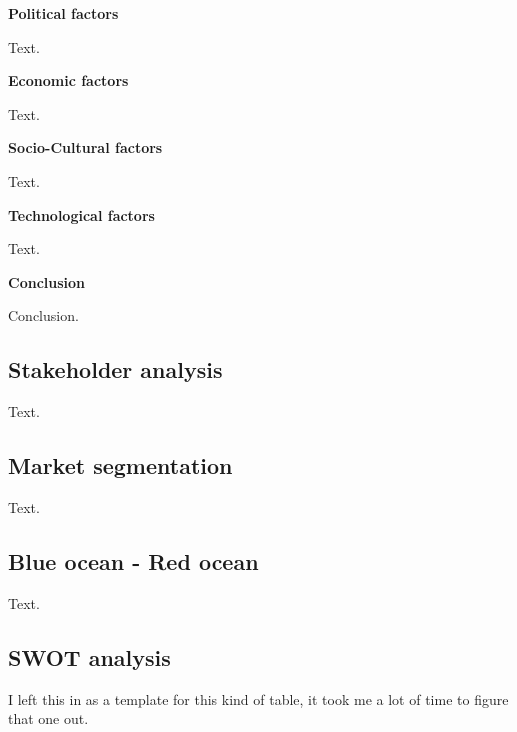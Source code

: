 \documentclass[12p]{article}
\begin{document}
\textbf{Political factors}

Text. \medskip

\textbf{Economic factors}

Text. \medskip

\textbf{Socio-Cultural factors}

Text. \medskip

\textbf{Technological factors}

Text. \medskip

\textbf{Conclusion}

Conclusion.

\newpage


\subsection{Stakeholder analysis} \label{Stakeholder_Analysis}

Text.

\newpage


\subsection{Market segmentation} \label{MarketSegmentation}

Text.

\newpage


\subsection{Blue ocean - Red ocean} \label{BlueOceanRedOcean}

Text.

\newpage


\subsection{SWOT analysis} \label{SWOT}

I left this in as a template for this kind of table, it took me a lot of time to figure that one out.
\end{document}
